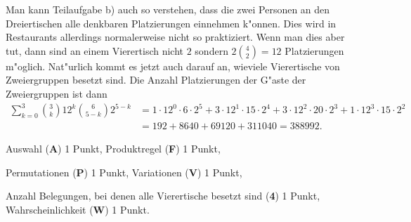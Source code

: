 \begin{diskussion}
Man kann Teilaufgabe b) auch so verstehen, dass die zwei Personen an
den Dreiertischen alle denkbaren Platzierungen einnehmen k"onnen.
Dies wird in Restaurants allerdings normalerweise nicht so praktiziert.
Wenn man dies aber tut, dann sind an einem Vierertisch nicht $2$ sondern
$2 \binom{4}{2}=12$ Platzierungen m"oglich.
Nat"urlich kommt es jetzt auch darauf an, wieviele Vierertische von 
Zweiergruppen besetzt sind.
Die Anzahl Platzierungen der G"aste der Zweiergruppen ist dann
\begin{align*}
\sum_{k=0}^3 \binom{3}{k}12^k\binom{6}{5-k}2^{5-k}
&=
1\cdot 12^0\cdot 6\cdot 2^5
+
3\cdot 12^1\cdot 15\cdot 2^4
+
3\cdot 12^2\cdot 20\cdot 2^3
+
1\cdot 12^3\cdot 15\cdot 2^2
\\
&=
192 + 8640 + 69120 + 311040
=
388992.
\end{align*}

\end{diskussion}

\begin{bewertung}
\begin{teilaufgaben}
\item
Auswahl ({\bf A}) 1 Punkt, Produktregel ({\bf F}) 1 Punkt,
\item
Permutationen ({\bf P}) 1 Punkt, Variationen ({\bf V}) 1 Punkt,
\item
Anzahl Belegungen, bei denen alle Vierertische besetzt sind
({\bf 4}) 1 Punkt,
Wahrscheinlichkeit ({\bf W}) 1 Punkt.
\end{teilaufgaben}
\end{bewertung}



